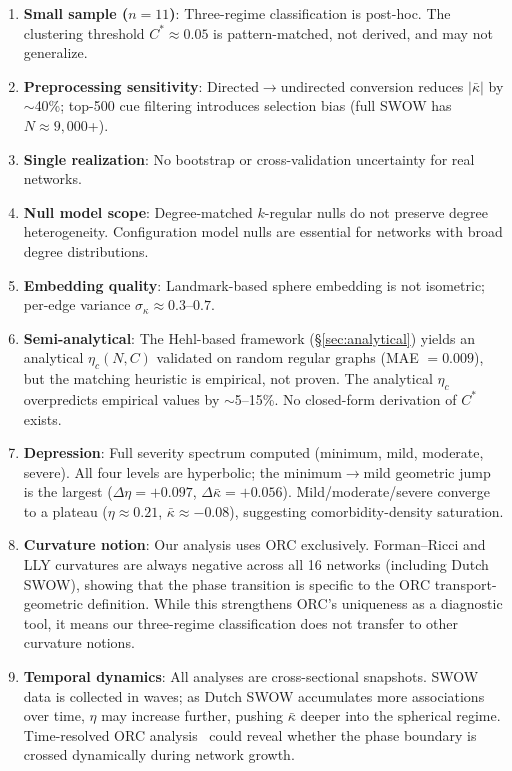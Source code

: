 \documentclass[11pt,a4paper]{article}
\newcommand{\kbar}{\bar{\kappa}}
\newcommand{\etac}{\eta_c}
\newcommand{\Cstar}{C^*}
\begin{document}
\begin{enumerate}
    \item \textbf{Small sample ($n=11$)}: Three-regime classification is post-hoc. The clustering threshold $\Cstar \approx 0.05$ is pattern-matched, not derived, and may not generalize.
    \item \textbf{Preprocessing sensitivity}: Directed$\to$undirected conversion reduces $|\kbar|$ by $\sim$40\%; top-500 cue filtering introduces selection bias (full SWOW has $N \approx 9{,}000$+).
    \item \textbf{Single realization}: No bootstrap or cross-validation uncertainty for real networks.
    \item \textbf{Null model scope}: Degree-matched $k$-regular nulls do not preserve degree heterogeneity. Configuration model nulls are essential for networks with broad degree distributions.
    \item \textbf{Embedding quality}: Landmark-based sphere embedding is not isometric; per-edge variance $\sigma_\kappa \approx 0.3$--$0.7$.
    \item \textbf{Semi-analytical}: The Hehl-based framework (\S\ref{sec:analytical}) yields an analytical $\etac(N, C)$ validated on random regular graphs (MAE $= 0.009$), but the matching heuristic is empirical, not proven. The analytical $\etac$ overpredicts empirical values by $\sim$5--15\%. No closed-form derivation of $\Cstar$ exists.
    \item \textbf{Depression}: Full severity spectrum computed (minimum, mild, moderate, severe). All four levels are hyperbolic; the minimum$\to$mild geometric jump is the largest ($\Delta\eta=+0.097$, $\Delta\kbar=+0.056$). Mild/moderate/severe converge to a plateau ($\eta\approx 0.21$, $\kbar\approx-0.08$), suggesting comorbidity-density saturation.
    \item \textbf{Curvature notion}: Our analysis uses ORC exclusively. Forman--Ricci and LLY curvatures are always negative across all 16 networks (including Dutch SWOW), showing that the phase transition is specific to the ORC transport-geometric definition. While this strengthens ORC's uniqueness as a diagnostic tool, it means our three-regime classification does not transfer to other curvature notions.
    \item \textbf{Temporal dynamics}: All analyses are cross-sectional snapshots. SWOW data is collected in waves; as Dutch SWOW accumulates more associations over time, $\eta$ may increase further, pushing $\kbar$ deeper into the spherical regime. Time-resolved ORC analysis~\cite{ni2019community} could reveal whether the phase boundary is crossed dynamically during network growth.
\end{enumerate}
\end{document}
